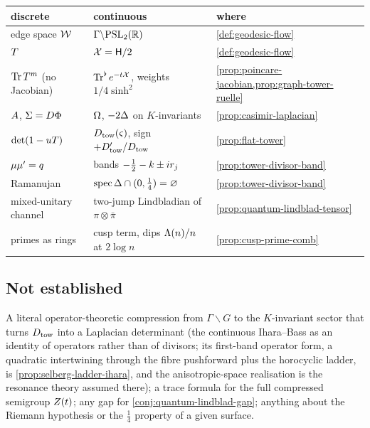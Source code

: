 \begin{center}\small
\begin{tabular}{lll}
\toprule
discrete & continuous & where \\
\midrule
edge space $\mathcal W$ & $\Gamma\backslash\mathrm{PSL}_2(\mathbb R)$ & \cref{def:geodesic-flow} \\
$T$ & $\mathcal X = \mathsf H/2$ & \cref{def:geodesic-flow} \\
$\operatorname{Tr}T^m$ (no Jacobian) & $\operatorname{Tr}^{\flat} e^{-t\mathcal X}$, weights $1/4\sinh^2$ & \cref{prop:poincare-jacobian,prop:graph-tower-ruelle} \\
$A$, $\Sigma = D\Phi$ & $\Omega$, $-2\Delta$ on $K$-invariants & \cref{prop:casimir-laplacian} \\
$\det(1-uT)$ & $D_{\mathrm{tow}}(\varsigma)$, sign $+D_{\mathrm{tow}}'/D_{\mathrm{tow}}$ & \cref{prop:flat-tower} \\
$\mu\mu' = q$ & bands $-\tfrac12-k\pm ir_{j}$ & \cref{prop:tower-divisor-band} \\
Ramanujan & $\operatorname{spec}\Delta\cap(0,\tfrac14) = \varnothing$ & \cref{prop:tower-divisor-band} \\
mixed-unitary channel & two-jump Lindbladian of $\pi\otimes\bar\pi$ & \cref{prop:quantum-lindblad-tensor} \\
primes as rings & cusp term, dips $\Lambda(n)/n$ at $2\log n$ & \cref{prop:cusp-prime-comb} \\
\bottomrule
\end{tabular}
\end{center}

\subsection{Not established}

A literal operator-theoretic compression from $\Gamma\backslash G$ to the
$K$-invariant sector that turns $D_{\mathrm{tow}}$ into a Laplacian determinant (the
continuous Ihara--Bass as an identity of operators rather than of divisors;
its first-band operator form, a quadratic intertwining through the fibre
pushforward plus the horocyclic ladder, is \cref{prop:selberg-ladder-ihara},
and the anisotropic-space realisation is the resonance theory assumed there);
a trace formula
for the full compressed semigroup $Z(t)$; any gap for
\cref{conj:quantum-lindblad-gap}; anything about the Riemann hypothesis or
the $\tfrac14$ property of a given surface.
